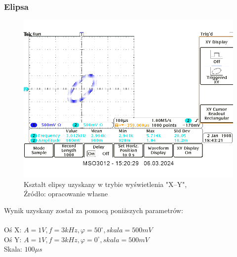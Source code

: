 \documentclass{article}
\begin{document}
        \subsubsection{Elipsa}
        \begin{figure}[!ht]
          \begin{center}
              \includegraphics[scale=0.25]{grafiki/elipsa.png}
              \caption{Kształt elipsy uzyskany w trybie wyświetlenia "X--Y",\\Źródło: opracowanie własne}
          \end{center}
        \end{figure}
        Wynik uzyskany został za pomocą poniższych parametrów: \\ \\
        Oś X: $A = 1V,f = 3kHz, \varphi = 50^\circ, skala = 500mV$ \\
        Oś Y: $A = 1V,f = 3kHz, \varphi = 0^\circ, skala = 500mV$ \\
        Skala: $100 \mu s$
\end{document}

